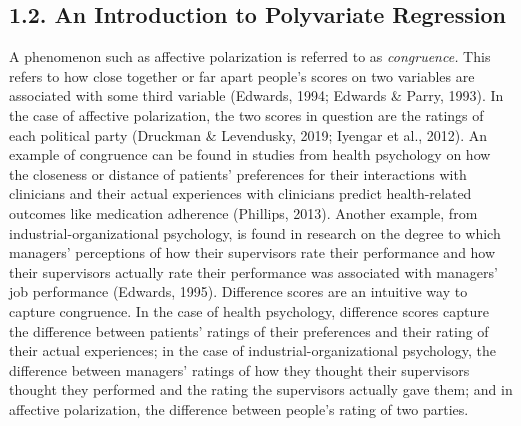 \documentclass[authordate, meta]{jote-new-article}
\begin{document}
	\subsection{1.2. An Introduction to Polyvariate Regression}



	A phenomenon such as affective polarization is referred to as \emph{congruence. }This refers to how close together or far apart people's scores on two variables are associated with some third variable (Edwards, 1994; Edwards \& Parry, 1993). In the case of affective polarization, the two scores in question are the ratings of each political party (Druckman \& Levendusky, 2019; Iyengar et al., 2012). An example of congruence can be found in studies from health psychology on how the closeness or distance of patients' preferences for their interactions with clinicians and their actual experiences with clinicians predict health-related outcomes like medication adherence (Phillips, 2013). Another example, from industrial-organizational psychology, is found in research on the degree to which managers' perceptions\emph{ }of how their supervisors rate their performance and how their supervisors actually\emph{ }rate their performance was associated with managers' job performance (Edwards, 1995). Difference scores are an intuitive way to capture congruence. In the case of health psychology, difference scores capture the difference between patients' ratings of their preferences and their rating of their actual experiences; in the case of industrial-organizational psychology, the difference between managers' ratings of how they thought their supervisors thought they performed and the rating the supervisors actually gave them; and in affective polarization, the difference between people's rating of two parties.
\end{document}
